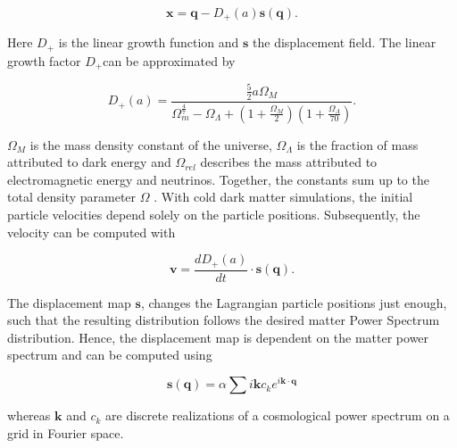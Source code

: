 \documentclass{article}
\begin{document}
\begin{equation}
    \mathbf{x} = \mathbf{q} - D_{+}(a)\mathbf{s}(\mathbf{q}).
\end{equation}

Here $D_+$ is the linear growth function and $\mathbf{s}$ the displacement field. The linear growth factor $D_+$can be approximated by  \citep{carroll2001cosmological}

\begin{equation}
    D_+(a) = \frac{\frac{5}{2} a \Omega_M}{
    \Omega_m^{\frac{4}{7}} - \Omega_{\Lambda} + ( 1 + \frac{\Omega_M}{2})(1 + \frac{\Omega_{\Lambda}}{70})
    }.
    \label{eq:growth}
\end{equation}

$\Omega_M$ is the mass density constant of the universe, $\Omega_{\Lambda}$ is the fraction of mass attributed to dark energy and $\Omega_{rel}$ describes the mass attributed to electromagnetic energy and neutrinos. Together, the constants sum up to the total density parameter $\Omega$ \citep{carroll2017introduction}. With cold dark matter simulations, the initial particle velocities depend solely on the particle positions. Subsequently, the velocity can be computed with

\begin{equation}
    \mathbf{v} = \frac{d D_+(a)}{d t} \cdot \mathbf{s}(\mathbf{q}).
\end{equation}






The displacement map $\mathbf{s}$, changes the Lagrangian particle positions just enough, such that the resulting distribution follows the desired matter Power Spectrum distribution. Hence, the displacement map is dependent on the matter power spectrum and can be computed using

\begin{equation}
    \mathbf{s}(\mathbf{q}) = \alpha \sum i \mathbf{k} c_k e^{i \mathbf{k} \cdot \mathbf{q}}
\end{equation}

whereas $\mathbf{k}$ and $c_k$ are discrete realizations of a cosmological power spectrum on a grid in Fourier space.
\end{document}
